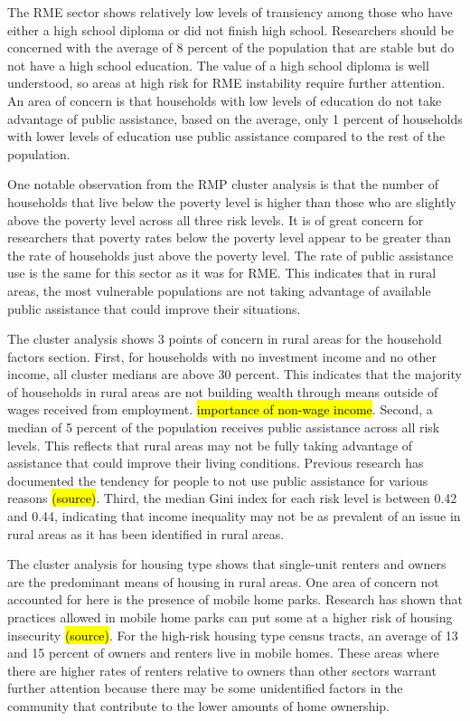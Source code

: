  The RME sector shows relatively low levels of transiency among those who have either a high school diploma or did not finish high school. Researchers should be concerned with the average of 8 percent of the population that are stable but do not have a high school education. The value of a high school diploma is well understood, so areas at high risk for RME instability require further attention. An area of concern is that households with low levels of education do not take advantage of public assistance, based on the average, only 1 percent of households with lower levels of education use public assistance compared to the rest of the population. 
 
 One notable observation from the RMP cluster analysis is that the number of households that live below the poverty level is higher than those who are slightly above the poverty level across all three risk levels. It is of great concern for researchers that poverty rates below the poverty level appear to be greater than the rate of households just above the poverty level. The rate of public assistance use is the same for this sector as it was for RME. This indicates that in rural areas, the most vulnerable populations are not taking advantage of available public assistance that could improve their situations. 
 
 The cluster analysis shows 3 points of concern in rural areas for the household factors section. First, for households with no investment income and no other income, all cluster medians are above 30 percent. This indicates that the majority of households in rural areas are not building wealth through means outside of wages received from employment. \hl{importance of non-wage income}. Second, a median of 5 percent of the population receives public assistance across all risk levels. This reflects that rural areas may not be fully taking advantage of assistance that could improve their living conditions. Previous research has documented the tendency for people to not use public assistance for various reasons \hl{(source)}. Third, the median Gini index for each risk level is between 0.42 and 0.44, indicating that income inequality may not be as prevalent of an issue in rural areas as it has been identified in rural areas.

The cluster analysis for housing type shows that single-unit renters and owners are the predominant means of housing in rural areas. One area of concern not accounted for here is the presence of mobile home parks. Research has shown that practices allowed in mobile home parks can put some at a higher risk of housing insecurity \hl{(source)}. For the high-risk housing type census tracts, an average of 13 and 15 percent of owners and renters live in mobile homes. These areas where there are higher rates of renters relative to owners than other sectors warrant further attention because there may be some unidentified factors in the community that contribute to the lower amounts of home ownership. 

